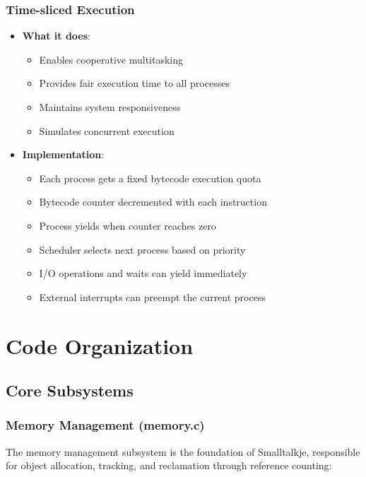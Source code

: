 \documentclass[12pt,a4paper]{report}
\begin{document}
\subsection{Time-sliced Execution}
\begin{itemize}
    \item \textbf{What it does}:
    \begin{itemize}
        \item Enables cooperative multitasking
        \item Provides fair execution time to all processes
        \item Maintains system responsiveness
        \item Simulates concurrent execution
    \end{itemize}
    
    \item \textbf{Implementation}:
    \begin{itemize}
        \item Each process gets a fixed bytecode execution quota
        \item Bytecode counter decremented with each instruction
        \item Process yields when counter reaches zero
        \item Scheduler selects next process based on priority
        \item I/O operations and waits can yield immediately
        \item External interrupts can preempt the current process
    \end{itemize}
\end{itemize}

\chapter{Code Organization}

\section{Core Subsystems}

\subsection{Memory Management (memory.c)}
The memory management subsystem is the foundation of Smalltalkje, responsible for object allocation, tracking, and reclamation through reference counting:
\end{document}

